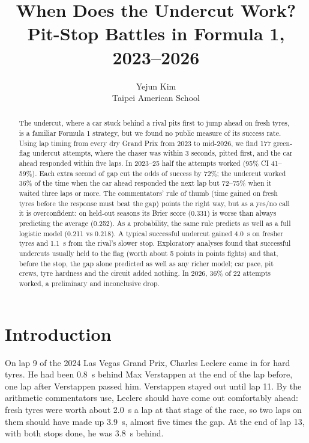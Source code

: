 \documentclass[12pt]{article}
\title{When Does the Undercut Work?\\Pit-Stop Battles in Formula 1, 2023--2026}
\author{Yejun Kim\\Taipei American School}
\date{}
\begin{document}
\maketitle
\thispagestyle{plain}
\newpage

\begin{abstract}
The undercut, where a car stuck behind a rival pits first to jump ahead on fresh tyres, is a familiar Formula 1 strategy, but we found no public measure of its success rate. Using lap timing from every dry Grand Prix from 2023 to mid-2026, we find 177 green-flag undercut attempts, where the chaser was within 3 seconds, pitted first, and the car ahead responded within five laps. In 2023--25 half the attempts worked (95\% CI 41--59\%). Each extra second of gap cut the odds of success by 72\%; the undercut worked 36\% of the time when the car ahead responded the next lap but 72--75\% when it waited three laps or more. The commentators' rule of thumb (time gained on fresh tyres before the response must beat the gap) points the right way, but as a yes/no call it is overconfident: on held-out seasons its Brier score (0.331) is worse than always predicting the average (0.252). As a probability, the same rule predicts as well as a full logistic model (0.211 vs 0.218). A typical successful undercut gained 4.0~s on fresher tyres and 1.1~s from the rival's slower stop. Exploratory analyses found that successful undercuts usually held to the flag (worth about 5 points in points fights) and that, before the stop, the gap alone predicted as well as any richer model; car pace, pit crews, tyre hardness and the circuit added nothing. In 2026, 36\% of 22 attempts worked, a preliminary and inconclusive drop.
\end{abstract}

\section{Introduction}

On lap 9 of the 2024 Las Vegas Grand Prix, Charles Leclerc came in for hard tyres. He had been 0.8~s behind Max Verstappen at the end of the lap before, one lap after Verstappen passed him. Verstappen stayed out until lap 11. By the arithmetic commentators use, Leclerc should have come out comfortably ahead: fresh tyres were worth about 2.0~s a lap at that stage of the race, so two laps on them should have made up 3.9~s, almost five times the gap. At the end of lap 13, with both stops done, he was 3.8~s behind. %
\end{document}
